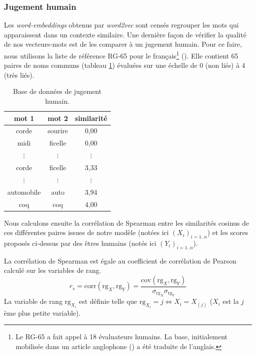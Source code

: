 \documentclass[11pt,french,french]{article}
\let\rmarkdownfootnote\footnote%
\def\footnote{\protect\rmarkdownfootnote}
\begin{document}
\subsubsection{Jugement humain}\label{sec:jugementHumain}

Les \emph{word-embeddings} obtenus par \emph{word2vec} sont censés
regrouper les mots qui apparaissent dans un contexte similaire. Une
dernière façon de vérifier la qualité de nos vecteurs-mots est de les
comparer à un jugement humain. Pour ce faire, nous utilisons la liste de
référence RG-65 pour le français\footnote{Le RG-65 a fait appel à 18
  évaluateurs humains. La base, initialement mobilisée dans un article
  anglophone (\cite{Rubenstein}) a été traduite de l'anglais.}
(\cite{Boumedyen}). Elle contient 65 paires de noms communs (tableau
\ref{table:human_judgement}) évaluées sur une échelle de 0 (non liés) à
4 (très liés).

\begin{table}[!h]
\begin{center}
\begin{tabular}{|c|c|c|}
    \hline
    mot 1 & mot 2 & similarité  \tabularnewline
    \hline
    corde & sourire & 0,00   \tabularnewline
    midi & ficelle & 0,00   \tabularnewline
    $\vdots$  & $\vdots$  & $\vdots$    \tabularnewline
    corde & ficelle & 3,33   \tabularnewline
    $\vdots$  & $\vdots$  & $\vdots$    \tabularnewline
    automobile & auto & 3,94   \tabularnewline
    coq & coq & 4,00   \tabularnewline
    \hline
 \end{tabular}
\captionsetup{margin=0cm,format=hang,justification=justified}
\caption{Base de données de jugement humain.}\label{table:human_judgement}
\end{center}
\end{table}

Nous calculons ensuite la corrélation de Spearman entre les similarités
cosinus de ces différentes paires issues de notre modèle (notées ici
\((X_i)_{i=1..n}\)) et les scores proposés ci-dessus par des êtres
humains (notés ici \((Y_i)_{i=1..n}\)).

La corrélation de Spearman est égale au coefficient de corrélation de
Pearson calculé sur les variables de rang. \[
r_s = \mathrm{corr}(\mathrm{rg}_X, \mathrm{rg}_Y) = 
\frac{\mathrm{cov}(\mathrm{rg}_X, \mathrm{rg}_Y)}{
\sigma_{\mathrm{rg}_X} \sigma_{\mathrm{rg}_Y}
}
\] La variable de rang \(\mathrm{rg}_{X_i}\) est définie telle que
\(\mathrm{rg}_{X_i}=j \iff X_i = X_{(j)}\) (\(X_i\) est la \(j\)ème plus
petite variable).
\end{document}
